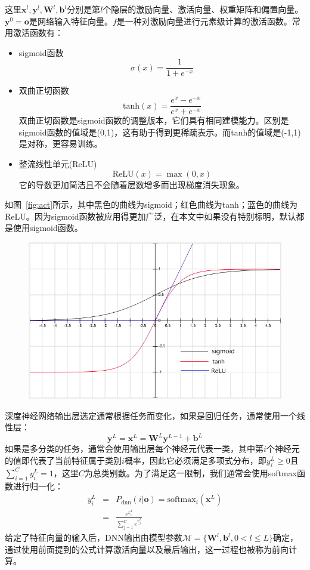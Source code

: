 这里$\mathbf{x}^l, \mathbf{y}^l, \mathbf{W}^l, \mathbf{b}^l$分别是第$l$个隐层的激励向量、激活向量、权重矩阵和偏置向量。$\mathbf{y}^0=\mathbf{o}$是网络输入特征向量。$f$是一种对激励向量进行元素级计算的激活函数。常用激活函数有：
\begin{itemize}
    \item sigmoid函数
    \begin{equation}
        \sigma(x)=\frac{1}{1+e^{-x}}
    \end{equation}
    \item 双曲正切函数
    \begin{equation}
        \text{tanh} (x)=\frac{e^x-e^{-x}}{e^{x}+e^{-x}}
    \end{equation}
    双曲正切函数是sigmoid函数的调整版本，它们具有相同建模能力。区别是sigmoid函数的值域是(0,1)，这有助于得到更稀疏表示。而tanh的值域是(-1,1)是对称，更容易训练。
    \item 整流线性单元(ReLU)
    \begin{equation}
        \text{ReLU}(x)= \max (0,x)
    \end{equation}
    它的导数更加简洁且不会随着层数增多而出现梯度消失现象。
\end{itemize}
如图~\ref{fig:act}所示，其中黑色的曲线为sigmoid；红色曲线为tanh；蓝色的曲线为ReLU。因为sigmoid函数被应用得更加广泛，在本文中如果没有特别标明，默认都是使用sigmoid函数。
\begin{figure}[!htp]
  \centering
    \captionstyle{\centering}
    \includegraphics[height=.5\textwidth]{figure/activation.png}
\end{figure}

深度神经网络输出层选定通常根据任务而变化，如果是回归任务，通常使用一个线性层：
\begin{equation}
    \mathbf{y}^L=\mathbf{x}^L=\mathbf{W}^L\mathbf{y}^{L-1}+\mathbf{b}^L
\end{equation}
如果是多分类的任务，通常会使用输出层每个神经元代表一类，其中第$i$个神经元的值即代表了当前特征属于类别$i$概率，因此它必须满足多项式分布，即$y^L_i \ge 0$且$\sum_{i=1}^C y_i^L=1$，这里$C$为总类别数。为了满足这一限制，我们通常会使用softmax函数进行归一化：
\begin{eqnarray}
    y_i^L&=&P_{\text{dnn}}(i|\mathbf{o})=\text{softmax}_i(\mathbf{x}^L) \\
    &=& \frac{e^{x_i^L}}{\sum_{j=1}^C e^{x_j^L}}
\end{eqnarray}
给定了特征向量的输入后，DNN输出由模型参数$\mathcal{M}=\{ \mathbf{W}^l, \mathbf{b}^l, 0 < l \le L\}$确定，通过使用前面提到的公式计算激活向量以及最后输出，这一过程也被称为前向计算。

